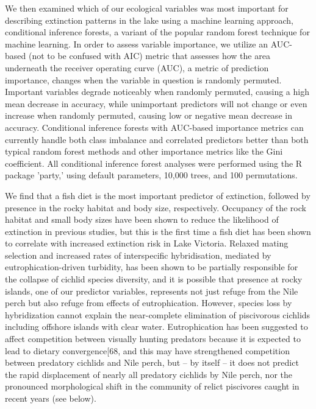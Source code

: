 We then examined which of our ecological variables was most important for describing extinction patterns in the lake using a machine learning approach, conditional inference forests, \cite{hothorn2006unbiased} a variant of the popular random forest technique for machine learning. In order to assess variable importance, we utilize an AUC-based (not to be confused with AIC) metric that assesses how the area underneath the receiver operating curve (AUC), a metric of prediction importance, changes when the variable in question is randomly permuted. Important variables degrade noticeably when randomly permuted, causing a high mean decrease in accuracy, while unimportant predictors will not change or even increase when randomly permuted, causing low or negative mean decrease in accuracy. Conditional inference forests with AUC-based importance metrics can currently handle both class imbalance and correlated predictors better than both typical random forest methods and other importance metrics like the Gini coefficient. \cite{hothorn2010party} All conditional inference forest analyses were performed using the R package 'party,' \cite{janitza2013auc} using default parameters, 10,000 trees, and 100 permutations.

We find that a fish diet is the most important predictor of extinction, followed by presence in the rocky habitat and body size, respectively. Occupancy of the rock habitat and small body sizes have been shown to reduce the likelihood of extinction in previous studies, \cite{witte_destruction_1992, seehausen1997patterns} but this is the first time a fish diet has been shown to correlate with increased extinction risk in Lake Victoria. Relaxed mating selection and increased rates of interspecific hybridisation, mediated by eutrophication-driven turbidity, has been shown to be partially responsible for the collapse of cichlid species diversity, \cite{seehausen1997patterns} and it is possible that presence at rocky islands, one of our predictor variables, represents not just refuge from the Nile perch \cite{witte_destruction_1992} but also refuge from effects of eutrophication. \cite{witte_destruction_1992, witte2013cichlid} However, species loss by hybridization cannot explain the near-complete elimination of piscivorous cichlids including offshore islands with clear water. Eutrophication has been suggested to affect competition between visually hunting predators because it is expected to lead to dietary convergence[68, and this may have strengthened competition between predatory cichlids and Nile perch, but -- by itself -- it does not predict the rapid displacement of nearly all predatory cichlids by Nile perch, nor the pronounced morphological shift in the community of relict piscivores caught in recent years (see below).

